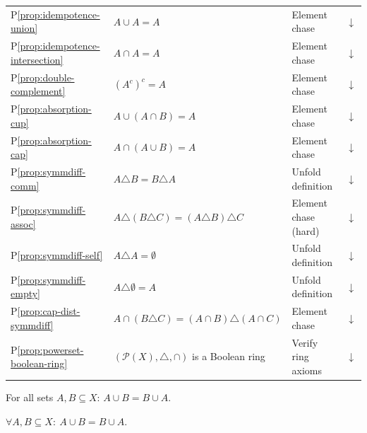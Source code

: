 \begin{tcolorbox}[colback=gray!6, colframe=gray!40, arc=2pt,
  left=6pt, right=6pt, top=4pt, bottom=4pt,
  title={\small\textbf{Section Toolkit --- Quick Reference}},
  fonttitle=\small\bfseries]
\begin{tabular}{l l l l}
P\ref{prop:idempotence-union}
  & $A\cup A = A$
  & Element chase & \hyperref[prf:idempotence-union]{$\downarrow$} \\
P\ref{prop:idempotence-intersection}
  & $A\cap A = A$
  & Element chase & \hyperref[prf:idempotence-intersection]{$\downarrow$} \\
P\ref{prop:double-complement}
  & $(A^c)^c = A$
  & Element chase & \hyperref[prf:double-complement]{$\downarrow$} \\
P\ref{prop:absorption-cup}
  & $A\cup(A\cap B) = A$
  & Element chase & \hyperref[prf:absorption-cup]{$\downarrow$} \\
P\ref{prop:absorption-cap}
  & $A\cap(A\cup B) = A$
  & Element chase & \hyperref[prf:absorption-cap]{$\downarrow$} \\
P\ref{prop:symmdiff-comm}
  & $A\triangle B = B\triangle A$
  & Unfold definition & \hyperref[prf:symmdiff-comm]{$\downarrow$} \\
P\ref{prop:symmdiff-assoc}
  & $A\triangle(B\triangle C) = (A\triangle B)\triangle C$
  & Element chase (hard) & \hyperref[prf:symmdiff-assoc]{$\downarrow$} \\
P\ref{prop:symmdiff-self}
  & $A\triangle A = \emptyset$
  & Unfold definition & \hyperref[prf:symmdiff-self]{$\downarrow$} \\
P\ref{prop:symmdiff-empty}
  & $A\triangle\emptyset = A$
  & Unfold definition & \hyperref[prf:symmdiff-empty]{$\downarrow$} \\
P\ref{prop:cap-dist-symmdiff}
  & $A\cap(B\triangle C)=(A\cap B)\triangle(A\cap C)$
  & Element chase & \hyperref[prf:cap-dist-symmdiff]{$\downarrow$} \\
P\ref{prop:powerset-boolean-ring}
  & $(\mathcal{P}(X),\triangle,\cap)$ is a Boolean ring
  & Verify ring axioms & \hyperref[prf:powerset-boolean-ring]{$\downarrow$} \\
\bottomrule
\end{tabular}
\end{tcolorbox}


\begin{proposition}
\label{prop:comm-union}
For all sets $A, B \subseteq X$: $A \cup B = B \cup A$.
\end{proposition}

\begin{remark*}
$\forall A,B\subseteq X:\ A\cup B = B\cup A$.
\end{remark*}

